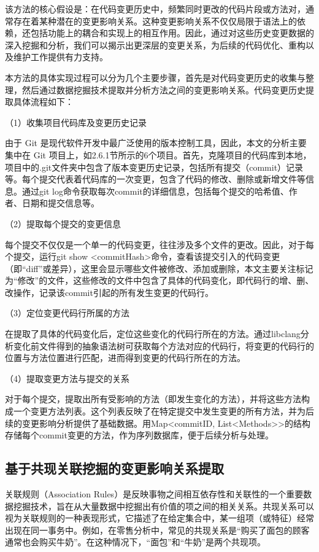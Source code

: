 该方法的核心假设是：在代码变更历史中，频繁同时更改的代码片段或方法对，通常存在着某种潜在的变更影响关系。这种变更影响关系不仅仅局限于语法上的依赖，还包括功能上的耦合和实现上的相互作用。因此，通过对这些历史变更数据的深入挖掘和分析，我们可以揭示出更深层的变更关系，为后续的代码优化、重构以及维护工作提供有力支持。

本方法的具体实现过程可以分为几个主要步骤，首先是对代码变更历史的收集与整理，然后通过数据挖掘技术提取并分析方法之间的变更影响关系。代码变更历史提取具体流程如下：

（1）收集项目代码库及变更历史记录

由于 Git 是现代软件开发中最广泛使用的版本控制工具，因此，本文的分析主要集中在 Git 项目上，如2.6.1节所示的6个项目。首先，克隆项目的代码库到本地，项目中的.git文件夹中包含了版本变更历史记录，包括所有提交（commit）记录等。每个提交代表着代码库的一次变更，包含了代码的修改、删除或新增文件等信息。通过git log命令获取每次commit的详细信息，包括每个提交的哈希值、作者、日期和提交信息等。

（2）提取每个提交的变更信息

每个提交不仅仅是一个单一的代码变更，往往涉及多个文件的更改。因此，对于每个提交，运行git show <commitHash>命令，查看该提交引入的代码变更（即“diff”或差异），这里会显示哪些文件被修改、添加或删除，本文主要关注标记为“修改”的文件，这些修改的文件中包含了具体的代码变化，即代码行的增、删、改操作，记录该commit引起的所有发生变更的代码行。

（3）定位变更代码行所属的方法

在提取了具体的代码变化后，定位这些变化的代码行所在的方法。通过libclang分析变化前文件得到的抽象语法树可获取每个方法对应的代码行，将变更的代码行的位置与方法位置进行匹配，进而得到变更的代码行所在的方法。

（4）提取变更方法与提交的关系

对于每个提交，提取出所有受影响的方法（即发生变化的方法），并将这些方法构成一个变更方法列表。这个列表反映了在特定提交中发生变更的所有方法，并为后续的变更影响分析提供了基础数据。用Map<commitID, List<Methods>>的结构存储每个commit变更的方法，作为序列数据库，便于后续分析与处理。


\subsection{基于共现关联挖掘的变更影响关系提取}

关联规则（Association Rules）是反映事物之间相互依存性和关联性的一个重要数据挖掘技术，旨在从大量数据中挖掘出有价值的项之间的相关关系。共现关系可以视为关联规则的一种表现形式，它描述了在给定集合中，某一组项（或特征）经常出现在同一事务中。例如，在零售分析中，常见的共现关系是“购买了面包的顾客通常也会购买牛奶”。在这种情况下，“面包”和“牛奶”是两个共现项。

